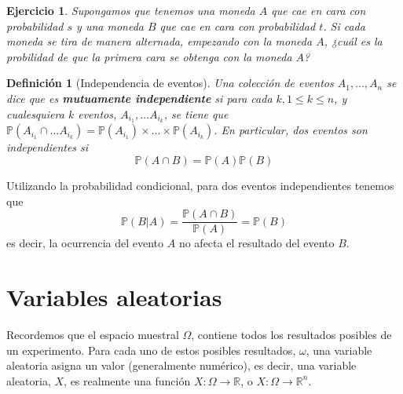 \documentclass[11pt]{report}
\theoremstyle{break}
\newtheorem{definicion}{Definición}[chapter]
\newtheorem{ejercicio}{Ejercicio}[chapter]
\theoremstyle{break}
\begin{document}
\begin{ejercicio}
Supongamos que tenemos una moneda $A$ que cae en cara con probabilidad $s$ y una moneda $B$ que cae en cara con probabilidad $t$. Si cada moneda se tira de manera alternada, empezando con la moneda $A$, ¿cuál es la probilidad de que la primera cara se obtenga con la moneda $A$?
\end{ejercicio}

\begin{definicion}[Independencia de eventos]
\label{definicion:independencia de eventos}
Una colección de eventos $A_1, \ldots, A_n$ se dice que es \textbf{mutuamente independiente} si para cada $k, 1 \leq k \leq n$, y cualesquiera $k$ eventos, $A_{i_1}, \ldots A_{i_k}$, se tiene que $\mathbb{P}(A_{i_1} \cap \ldots A_{i_k}) = \mathbb{P}(A_{i_1}) \times \ldots \times \mathbb{P}(A_{i_k})$.
En particular, dos eventos son independientes si
$$
\mathbb{P}(A \cap B) = \mathbb{P}(A)\mathbb{P}(B)
$$ 
\end{definicion}
Utilizando la probabilidad condicional, para dos eventos independientes tenemos que
$$
\mathbb{P}(B|A) = \dfrac{\mathbb{P}(A \cap B)}{\mathbb{P}(A)} = \mathbb{P}(B)
$$
es decir, la ocurrencia del evento $A$ no afecta el resultado del evento $B$.

\chapter{Variables aleatorias}
\label{capitulo:variables aleatorias}

Recordemos que el espacio muestral $\Omega$, contiene todos los resultados posibles de un experimento. Para cada uno de estos posibles resultados, $\omega$, una variable aleatoria asigna un valor (generalmente numérico), es decir, una variable aleatoria, $X$, es realmente una función $X: \Omega \rightarrow \mathbb{R}$, o $X: \Omega \rightarrow \mathbb{R}^n$.
\end{document}
